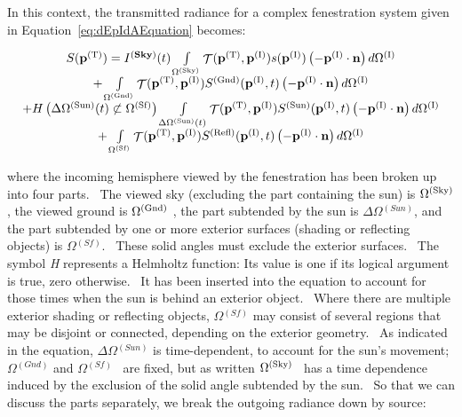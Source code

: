 In this context, the transmitted radiance for a complex fenestration system given in Equation~\ref{eq:dEpIdAEquation} becomes:

\begin{equation}
\begin{array}{c}S({{\bf{p}}^{{\rm{(T)}}}}) = {I^{({\bf{Sky}})}}(t)\int\limits_{{\Omega ^{{\rm{(Sky)}}}}} {{\mathop{\rm \mathcal{T}}\nolimits} ({{\bf{p}}^{{\rm{(T)}}}},{{\bf{p}}^{{\rm{(I)}}}})s({{\bf{p}}^{{\rm{(I)}}}})\left( { - {{\bf{p}}^{{\rm{(I)}}}}\cdot {\bf{n}}} \right)d{\Omega ^{{\rm{(I)}}}}} \\ + \int\limits_{{\Omega ^{{\rm{(Gnd)}}}}} {{\mathop{\rm \mathcal{T}}\nolimits} ({{\bf{p}}^{{\rm{(T)}}}},{{\bf{p}}^{{\rm{(I)}}}}){S^{{\rm{(Gnd)}}}}({{\bf{p}}^{{\rm{(I)}}}},t)\left( { - {{\bf{p}}^{{\rm{(I)}}}}\cdot {\bf{n}}} \right)d{\Omega ^{{\rm{(I)}}}}} \\ + H\left( {\Delta {\Omega ^{{\rm{(Sun)}}}}(t) \not\subset {\Omega ^{{\rm{(Sf)}}}}} \right)\int\limits_{\Delta {\Omega ^{{\rm{(Sun)}}}}(t)} {{\mathop{\rm \mathcal{T}}\nolimits} ({{\bf{p}}^{{\rm{(T)}}}},{{\bf{p}}^{{\rm{(I)}}}}){S^{{\rm{(Sun)}}}}({{\bf{p}}^{{\rm{(I)}}}},t)\left( { - {{\bf{p}}^{{\rm{(I)}}}}\cdot {\bf{n}}} \right)d{\Omega ^{{\rm{(I)}}}}} \\ + \int\limits_{{\Omega ^{{\rm{(Sf)}}}}} {{\mathop{\rm \mathcal{T}}\nolimits} ({{\bf{p}}^{{\rm{(T)}}}},{{\bf{p}}^{{\rm{(I)}}}}){S^{{\rm{(Refl)}}}}({{\bf{p}}^{{\rm{(I)}}}},t)\left( { - {{\bf{p}}^{{\rm{(I)}}}}\cdot {\bf{n}}} \right)d{\Omega ^{{\rm{(I)}}}}} \end{array}
\end{equation}

where the incoming hemisphere viewed by the fenestration has been broken up into four parts.~ The viewed sky (excluding the part containing the sun) is \({\Omega ^{{\rm{(Sky)}}}}\) , the viewed ground is \({\Omega ^{{\rm{(Gnd)}}}}\) , the part subtended by the sun is \(\Delta\Omega\)\(^{(Sun)}\), and the part subtended by one or more exterior surfaces (shading or reflecting objects) is \(\Omega\)\(^{(Sf)}\).~ These solid angles must exclude the exterior surfaces.~ The symbol \emph{H} represents a Helmholtz function: Its value is one if its logical argument is true, zero otherwise.~ It has been inserted into the equation to account for those times when the sun is behind an exterior object.~ Where there are multiple exterior shading or reflecting objects, \(\Omega\)\(^{(Sf)}\) may consist of several regions that may be disjoint or connected, depending on the exterior geometry.~ As indicated in the equation, \(\Delta\Omega\)\(^{(Sun)}\) is time-dependent, to account for the sun's movement; \(\Omega\)\(^{(Gnd)}\) and \(\Omega\)\(^{(Sf)}\)~ are fixed, but as written \({\Omega ^{{\rm{(Sky)}}}}\) ~has a time dependence induced by the exclusion of the solid angle subtended by the sun.~ So that we can discuss the parts separately, we break the outgoing radiance down by source:

